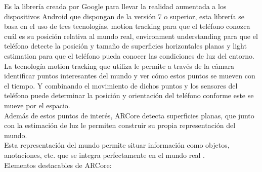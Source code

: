 Es la librería creada por Google para llevar la realidad aumentada a los dispositivos Android que dispongan de la versión 7 o superior, esta librería se basa en el uso de tres tecnologías, motion tracking para que el teléfono conozca cuál es su posición relativa al mundo real, environment understanding para que el teléfono detecte la posición y tamaño de superficies horizontales planas y light estimation para que el teléfono pueda conocer las condiciones de luz del entorno.\\

La tecnología motion tracking que utiliza le permite a través de la cámara identificar puntos interesantes del mundo y ver cómo estos puntos se mueven con el tiempo. Y combinando el movimiento de dichos puntos y los sensores del teléfono puede determinar la posición y orientación del teléfono conforme este se mueve por el espacio.\\

Además de estos puntos de interés, ARCore detecta superficies planas, que junto con la estimación de luz le permiten construir su propia representación del mundo.\\

Esta representación del mundo permite situar información como objetos, anotaciones, etc. que se integra perfectamente en el mundo real \cite{arcore}.\\

Elementos destacables de ARCore:

